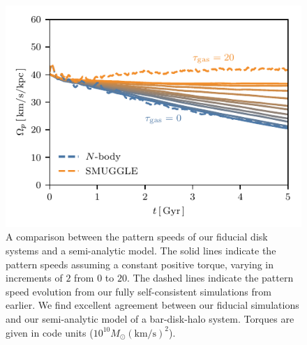 \documentclass[twocolumn,linenumbers,trackchanges]{aastex631}
\newcommand{\kms}{\ensuremath{\textrm{km}/\textrm{s}}}
\newcommand{\Msun}{\ensuremath{M_{\odot}}}
\begin{document}
\begin{figure}
    \centering
    \includegraphics[width=\columnwidth]{fig/samGvar.pdf}
    \caption{A comparison between the pattern speeds of our fiducial disk
    systems and a semi-analytic model. The solid lines indicate the pattern
    speeds assuming a constant positive torque, varying in increments of $2$
    from $0$ to $20$. The dashed lines indicate the pattern speed evolution from
    our fully self-consistent simulations from earlier. We find excellent
    agreement between our fiducial simulations and our semi-analytic model of a
    bar-disk-halo system. Torques are given in code units ($10^{10}\Msun
    \left(\kms\right)^2$).}
    \label{fig:sam}
\end{figure}
\end{document}
